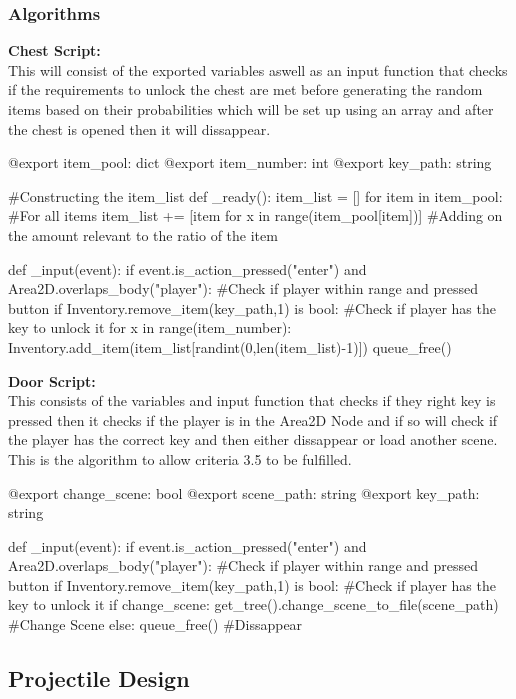 \documentclass{article}
\begin{document}
        \subsubsection{Algorithms}
        \textbf{Chest Script:}\\
        This will consist of the exported variables aswell as an input function that checks if the requirements to unlock the chest are met before generating the random items based on their probabilities which will be set up using an array and after the chest is opened then it will dissappear.\\
        \begin{python}
@export item_pool: dict
@export item_number: int
@export key_path: string

#Constructing the item_list
def _ready():
   item_list = []
   for item in item_pool: #For all items
     item_list += [item for x in range(item_pool[item])] #Adding on the amount relevant to the ratio of the item

def _input(event):
   if event.is_action_pressed("enter") and Area2D.overlaps_body("player"): #Check if player within range and pressed button
      if Inventory.remove_item(key_path,1) is bool: #Check if player has the key to unlock it 
         for x in range(item_number):
            Inventory.add_item(item_list[randint(0,len(item_list)-1)])
        queue_free()
   
        \end{python}
        \textbf{Door Script:}\\
        This consists of the variables and input function that checks if they right key is pressed then it checks if the player is in the Area2D Node and if so will check if the player has the correct key and then either dissappear or load another scene. This is the algorithm to allow criteria 3.5 to be fulfilled.\\
        \begin{python}
@export change_scene: bool
@export scene_path: string
@export key_path: string

def _input(event):
   if event.is_action_pressed("enter") and Area2D.overlaps_body("player"): #Check if player within range and pressed button
      if Inventory.remove_item(key_path,1) is bool: #Check if player has the key to unlock it 
         if change_scene:
            get_tree().change_scene_to_file(scene_path) #Change Scene
         else:
            queue_free() #Dissappear
        \end{python}
        \subsection{Projectile Design}
\end{document}
